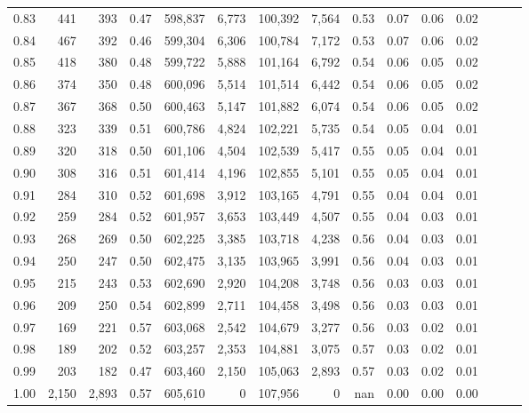 \begin{tabular}{rrrrrrrrrrrrrrr}
0.83 &     441 &    393 &  0.47 &  598,837 &    6,773 &  100,392 &    7,564 &  0.53 &  0.07 &  0.06 &      0.02 \\
0.84 &     467 &    392 &  0.46 &  599,304 &    6,306 &  100,784 &    7,172 &  0.53 &  0.07 &  0.06 &      0.02 \\
0.85 &     418 &    380 &  0.48 &  599,722 &    5,888 &  101,164 &    6,792 &  0.54 &  0.06 &  0.05 &      0.02 \\
0.86 &     374 &    350 &  0.48 &  600,096 &    5,514 &  101,514 &    6,442 &  0.54 &  0.06 &  0.05 &      0.02 \\
0.87 &     367 &    368 &  0.50 &  600,463 &    5,147 &  101,882 &    6,074 &  0.54 &  0.06 &  0.05 &      0.02 \\
0.88 &     323 &    339 &  0.51 &  600,786 &    4,824 &  102,221 &    5,735 &  0.54 &  0.05 &  0.04 &      0.01 \\
0.89 &     320 &    318 &  0.50 &  601,106 &    4,504 &  102,539 &    5,417 &  0.55 &  0.05 &  0.04 &      0.01 \\
0.90 &     308 &    316 &  0.51 &  601,414 &    4,196 &  102,855 &    5,101 &  0.55 &  0.05 &  0.04 &      0.01 \\
0.91 &     284 &    310 &  0.52 &  601,698 &    3,912 &  103,165 &    4,791 &  0.55 &  0.04 &  0.04 &      0.01 \\
0.92 &     259 &    284 &  0.52 &  601,957 &    3,653 &  103,449 &    4,507 &  0.55 &  0.04 &  0.03 &      0.01 \\
0.93 &     268 &    269 &  0.50 &  602,225 &    3,385 &  103,718 &    4,238 &  0.56 &  0.04 &  0.03 &      0.01 \\
0.94 &     250 &    247 &  0.50 &  602,475 &    3,135 &  103,965 &    3,991 &  0.56 &  0.04 &  0.03 &      0.01 \\
0.95 &     215 &    243 &  0.53 &  602,690 &    2,920 &  104,208 &    3,748 &  0.56 &  0.03 &  0.03 &      0.01 \\
0.96 &     209 &    250 &  0.54 &  602,899 &    2,711 &  104,458 &    3,498 &  0.56 &  0.03 &  0.03 &      0.01 \\
0.97 &     169 &    221 &  0.57 &  603,068 &    2,542 &  104,679 &    3,277 &  0.56 &  0.03 &  0.02 &      0.01 \\
0.98 &     189 &    202 &  0.52 &  603,257 &    2,353 &  104,881 &    3,075 &  0.57 &  0.03 &  0.02 &      0.01 \\
0.99 &     203 &    182 &  0.47 &  603,460 &    2,150 &  105,063 &    2,893 &  0.57 &  0.03 &  0.02 &      0.01 \\
1.00 &   2,150 &  2,893 &  0.57 &  605,610 &        0 &  107,956 &        0 &   nan &  0.00 &  0.00 &      0.00 \\
\bottomrule
\end{tabular}
